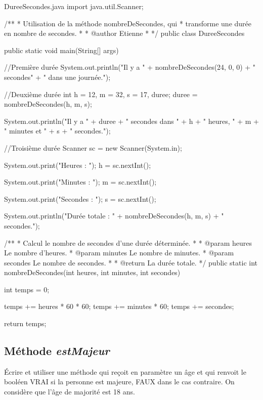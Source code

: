 \documentclass[12pt]{article}
\begin{document}
\begin{MyTCB}{DureeSecondes.java}
import java.util.Scanner;

/**
 * Utilisation de la méthode nombreDeSecondes, qui
 * transforme une durée en nombre de secondes.
 *
 * @author Etienne
 *
 */
public class DureeSecondes {

	
	public static void main(String[] args) {

		
		//Première durée
		System.out.println("Il y a " + nombreDeSecondes(24, 0, 0) + " secondes"
				+ " dans une journée.");
		
		
		//Deuxième durée
		int h = 12, m = 32, s = 17, duree;
		duree = nombreDeSecondes(h, m, s);
		
		System.out.println("Il y a " + duree + " secondes dans " 
				+ h + " heures, " + m + " minutes et " + s + " secondes.");

		
		//Troisième durée
		Scanner sc = new Scanner(System.in);
		
		System.out.print("Heures : ");
		h = sc.nextInt();
		
		System.out.print("Minutes : ");
		m = sc.nextInt();
		
		System.out.print("Secondes : ");
		s = sc.nextInt();
		
		System.out.println("Durée totale : " + nombreDeSecondes(h, m, s) + " secondes.");
		
	}
	
	
	/**
	 * Calcul le nombre de secondes d'une durée déterminée.
	 * 
	 * @param heures Le nombre d'heures.
	 * @param minutes Le nombre de minutes.
	 * @param secondes Le nombre de secondes.
	 * 
	 * @return La durée totale.
	 */
	public static int nombreDeSecondes(int heures, int minutes, int secondes) {
		
		int temps = 0;
		
		temps += heures * 60 * 60;
		temps += minutes * 60;
		temps += secondes;
		
		return temps;
		
	}

}
\end{MyTCB}
\subsection{Méthode \emph{estMajeur}}

Écrire et utiliser une méthode qui reçoit en paramètre un âge et qui renvoit le booléen VRAI si la personne est majeure, FAUX dans le cas contraire. On considère que l'âge de majorité est 18 ans.
\end{document}
